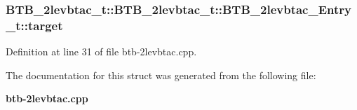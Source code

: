 \subsubsection[{target}]{ BTB\_\-2levbtac\_\-t::BTB\_\-2levbtac\_\-t::BTB\_\-2levbtac\_\-Entry\_\-t::target}\label{structBTB__2levbtac__t_1_1BTB__2levbtac__Entry__t_ae221c42e91275dc60ecabffe33f7fca}




Definition at line 31 of file btb-2levbtac.cpp.

The documentation for this struct was generated from the following file:\begin{CompactItemize}
\item 
{\bf btb-2levbtac.cpp}\end{CompactItemize}
